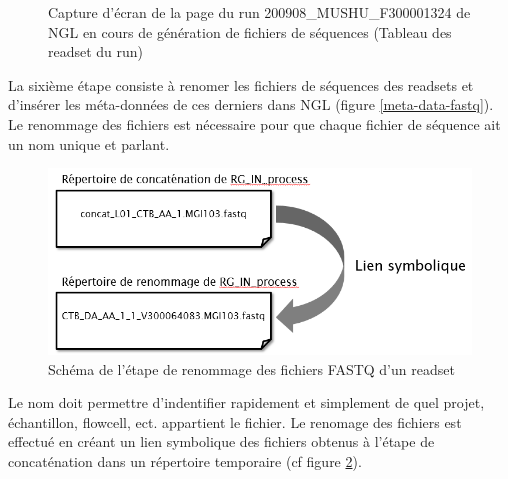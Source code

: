 \begin{figure}[H]
    \centering
    \caption{\footnotesize{Capture d'écran de la page du run 200908\_MUSHU\_F300001324 de NGL en cours de génération de fichiers de séquences (Tableau des readset du run)}}
    \label{NGL-screenshot_tab-run-readset}
\end{figure}

La sixième étape consiste à renomer les fichiers de séquences des readsets et d'insérer les méta-données de ces derniers dans NGL (figure \ref{meta-data-fastq}).
Le renommage des fichiers est nécessaire pour que chaque fichier de séquence ait un nom unique et \og parlant\fg{}.\\

\begin{minipage}{0.45\textwidth}
    \begin{figure}[H]
        \centering
        \includegraphics[width=1\textwidth]{img/Schema-renomage-fastq.png}
        \caption{\footnotesize{Schéma de l'étape de renommage des fichiers FASTQ d'un readset}}
        \label{schema-rename-fastq}
    \end{figure}
\end{minipage}
\hfill
\begin{minipage}{0.45\textwidth}
    Le nom doit permettre d'indentifier rapidement et simplement de quel projet, échantillon, flowcell, ect.
    appartient le fichier.
    Le renomage des fichiers est effectué en créant un lien symbolique des fichiers obtenus à l'étape de \og concaténation\fg{} dans un répertoire temporaire (cf figure \ref{schema-rename-fastq}).
\end{minipage}\\

